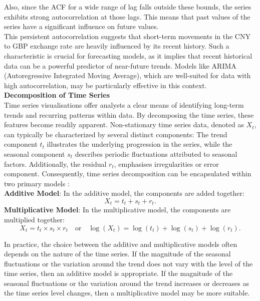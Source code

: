 \documentclass{article}\usepackage[]{graphicx}\usepackage[]{xcolor}
\numberwithin{equation}{section}
\begin{document}
\noindent 
Also, since the ACF for a wide range of lag falls outside these bounds, the series exhibits strong autocorrelation at those lags. This means that past values of the series have a significant influence on future values.\\

\noindent
This persistent autocorrelation suggests that short-term movements in the CNY to GBP exchange rate are heavily influenced by its recent history. Such a characteristic is crucial for forecasting models, as it implies that recent historical data can be a powerful predictor of near-future trends. Models like ARIMA (Autoregressive Integrated Moving Average), which are well-suited for data with high autocorrelation, may be particularly effective in this context.\\

\noindent
\textbf{Decomposition of Time Series}\\
\noindent
\noindent Time series visualisations offer analysts a clear means of identifying long-term trends and recurring patterns within data. By decomposing the time series, these features become readily apparent. Non-stationary time series data, denoted as $X_t$, can typically be characterized by several distinct components: The trend component $t_t$ illustrates the underlying progression in the series, while the seasonal component $s_t$ describes periodic fluctuations attributed to seasonal factors. Additionally, the residual $r_t$, emphasises irregularities or error component. Consequently, time series decomposition can be encapsulated within two primary models \cite{Brockwell2016Introduction}:\\

\noindent \textbf{Additive Model}: In the additive model, the components are added together:
\[
X_t = t_t + s_t + r_t.
\]
\textbf{Multiplicative Model}: In the multiplicative model, the components are multiplied together:
\[
X_t = t_t \times s_t \times r_t \quad \text{or} \quad \log(X_t) = \log(t_t) + \log(s_t) + \log(r_t).
\]

\noindent In practice, the choice between the additive and multiplicative models often depends on the nature of the time series. If the magnitude of the seasonal fluctuations or the variation around the trend does not vary with the level of the time series, then an additive model is appropriate. If the magnitude of the seasonal fluctuations or the variation around the trend increases or decreases as the time series level changes, then a multiplicative model may be more suitable.\\
\end{document}
